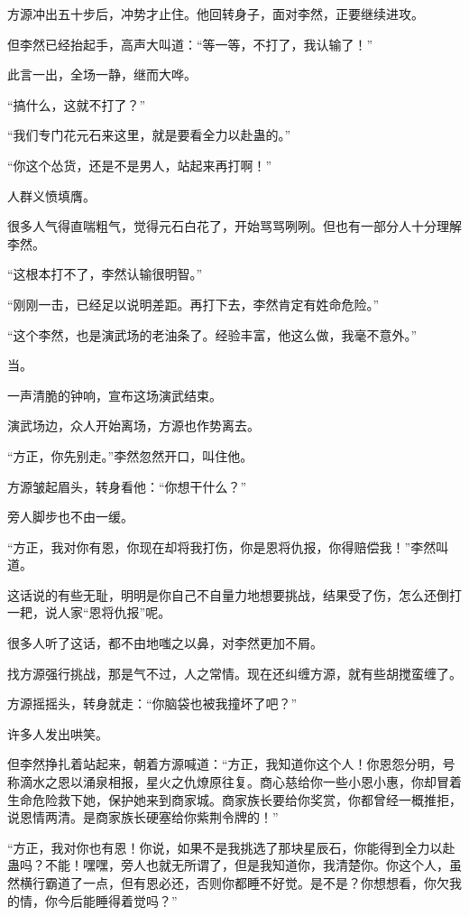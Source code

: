 
\begin{this_body}

方源冲出五十步后，冲势才止住。他回转身子，面对李然，正要继续进攻。

但李然已经抬起手，高声大叫道：“等一等，不打了，我认输了！”

此言一出，全场一静，继而大哗。

“搞什么，这就不打了？”

“我们专门花元石来这里，就是要看全力以赴蛊的。”

“你这个怂货，还是不是男人，站起来再打啊！”

人群义愤填膺。

很多人气得直喘粗气，觉得元石白花了，开始骂骂咧咧。但也有一部分人十分理解李然。

“这根本打不了，李然认输很明智。”

“刚刚一击，已经足以说明差距。再打下去，李然肯定有姓命危险。”

“这个李然，也是演武场的老油条了。经验丰富，他这么做，我毫不意外。”

当。

一声清脆的钟响，宣布这场演武结束。

演武场边，众人开始离场，方源也作势离去。

“方正，你先别走。”李然忽然开口，叫住他。

方源皱起眉头，转身看他：“你想干什么？”

旁人脚步也不由一缓。

“方正，我对你有恩，你现在却将我打伤，你是恩将仇报，你得赔偿我！”李然叫道。

这话说的有些无耻，明明是你自己不自量力地想要挑战，结果受了伤，怎么还倒打一耙，说人家“恩将仇报”呢。

很多人听了这话，都不由地嗤之以鼻，对李然更加不屑。

找方源强行挑战，那是气不过，人之常情。现在还纠缠方源，就有些胡搅蛮缠了。

方源摇摇头，转身就走：“你脑袋也被我撞坏了吧？”

许多人发出哄笑。

但李然挣扎着站起来，朝着方源喊道：“方正，我知道你这个人！你恩怨分明，号称滴水之恩以涌泉相报，星火之仇燎原往复。商心慈给你一些小恩小惠，你却冒着生命危险救下她，保护她来到商家城。商家族长要给你奖赏，你都曾经一概推拒，说恩情两清。是商家族长硬塞给你紫荆令牌的！”

“方正，我对你也有恩！你说，如果不是我挑选了那块星辰石，你能得到全力以赴蛊吗？不能！嘿嘿，旁人也就无所谓了，但是我知道你，我清楚你。你这个人，虽然横行霸道了一点，但有恩必还，否则你都睡不好觉。是不是？你想想看，你欠我的情，你今后能睡得着觉吗？”


\end{this_body}
